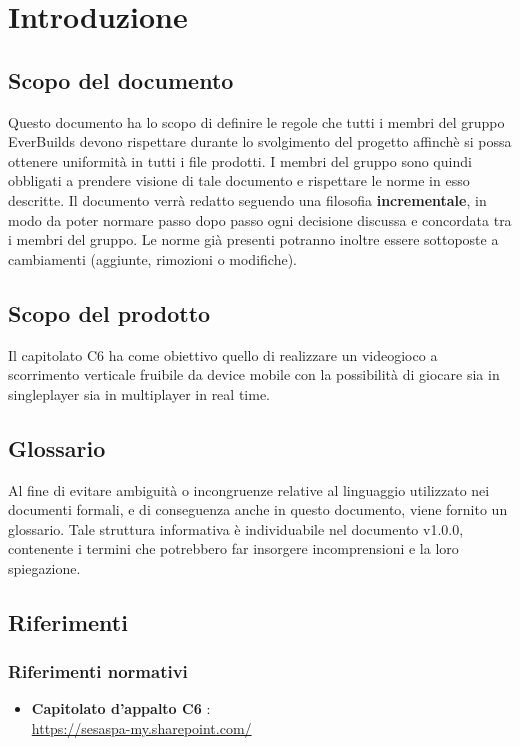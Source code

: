\section{Introduzione}
    \subsection{Scopo del documento}
        Questo documento ha lo scopo di definire le regole che tutti i membri del gruppo EverBuilds devono rispettare durante lo svolgimento del progetto affinchè si possa ottenere uniformità in tutti i file prodotti.
        I membri del gruppo sono quindi obbligati a prendere visione di tale documento e rispettare le norme in esso descritte.
        Il documento verrà redatto seguendo una filosofia \textbf{incrementale}, in modo da poter normare passo dopo passo ogni decisione discussa e concordata tra i membri del gruppo. Le norme già presenti potranno inoltre essere sottoposte a cambiamenti (aggiunte, rimozioni o modifiche).
    \subsection{Scopo del prodotto}
        Il capitolato C6 ha come obiettivo quello di realizzare un videogioco a scorrimento verticale fruibile da device mobile con la possibilità di giocare sia in singleplayer sia in multiplayer in real time. 
    \subsection{Glossario}
        Al fine di evitare ambiguità o incongruenze relative al linguaggio utilizzato nei documenti formali, e di conseguenza anche in questo documento, viene fornito un glossario. Tale struttura informativa è individuabile nel documento  v1.0.0, contenente i termini che potrebbero far insorgere incomprensioni e la loro spiegazione.
    \subsection{Riferimenti}
        \subsubsection{Riferimenti normativi}
            \begin{itemize}
                \item\textbf{Capitolato d'appalto C6} : \\
                \href{https://sesaspa-my.sharepoint.com/personal/s_dindo_vargroup_it/_layouts/15/onedrive.aspx?id=\%2Fpersonal\%2Fs\%5Fdindo\%5Fvargroup\%5Fit\%2FDocuments\%2FDownload\%2Fupload\%2FIngegneria\%5Fsoftware\%2FCapitolato\%5FIngegneria\%5Fsoftware\%2Epdf&parent=\%2Fpersonal\%2Fs\%5Fdindo\%5Fvargroup\%5Fit\%2FDocuments\%2FDownload\%2Fupload\%2FIngegneria\%5Fsoftware&originalPath=aHR0cHM6Ly9zZXNhc3BhLW15LnNoYXJlcG9pbnQuY29tLzpiOi9nL3BlcnNvbmFsL3NfZGluZG9fdmFyZ3JvdXBfaXQvRVRodmF5MGY2S1ZDb1h5ZFlPY2UybGtCdC1NWWNuVzF5YWZSWEZYVklPSXNIZz9ydGltZT13T1VuQ0F5czJFZw }{https://sesaspa-my.sharepoint.com/}
            \end{itemize}
